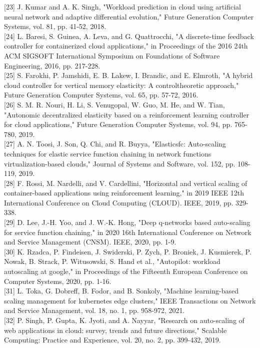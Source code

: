 \documentclass[10pt]{article}
\begin{document}
[23] J. Kumar and A. K. Singh, "Workload prediction in cloud using artificial neural network and adaptive differential evolution," Future Generation Computer Systems, vol. 81, pp. 41-52, 2018.\\[0pt]
[24] L. Baresi, S. Guinea, A. Leva, and G. Quattrocchi, "A discrete-time feedback controller for containerized cloud applications," in Proceedings of the 2016 24th ACM SIGSOFT International Symposium on Foundations of Software Engineering, 2016, pp. 217-228.\\[0pt]
[25] S. Farokhi, P. Jamshidi, E. B. Lakew, I. Brandic, and E. Elmroth, "A hybrid cloud controller for vertical memory elasticity: A controltheoretic approach," Future Generation Computer Systems, vol. 65, pp. 57-72, 2016.\\[0pt]
[26] S. M. R. Nouri, H. Li, S. Venugopal, W. Guo, M. He, and W. Tian, "Autonomic decentralized elasticity based on a reinforcement learning controller for cloud applications," Future Generation Computer Systems, vol. 94, pp. 765-780, 2019.\\[0pt]
[27] A. N. Toosi, J. Son, Q. Chi, and R. Buyya, "Elasticsfc: Auto-scaling techniques for elastic service function chaining in network functions virtualization-based clouds," Journal of Systems and Software, vol. 152, pp. 108-119, 2019.\\[0pt]
[28] F. Rossi, M. Nardelli, and V. Cardellini, "Horizontal and vertical scaling of container-based applications using reinforcement learning," in 2019 IEEE 12th International Conference on Cloud Computing (CLOUD). IEEE, 2019, pp. 329-338.\\[0pt]
[29] D. Lee, J.-H. Yoo, and J. W.-K. Hong, "Deep q-networks based auto-scaling for service function chaining," in 2020 16th International Conference on Network and Service Management (CNSM). IEEE, 2020, pp. 1-9.\\[0pt]
[30] K. Rzadca, P. Findeisen, J. Swiderski, P. Zych, P. Broniek, J. Kusmierek, P. Nowak, B. Strack, P. Witusowski, S. Hand et al., "Autopilot: workload autoscaling at google," in Proceedings of the Fifteenth European Conference on Computer Systems, 2020, pp. 1-16.\\[0pt]
[31] L. Toka, G. Dobreff, B. Fodor, and B. Sonkoly, "Machine learning-based scaling management for kubernetes edge clusters," IEEE Transactions on Network and Service Management, vol. 18, no. 1, pp. 958-972, 2021.\\[0pt]
[32] P. Singh, P. Gupta, K. Jyoti, and A. Nayyar, "Research on auto-scaling of web applications in cloud: survey, trends and future directions," Scalable Computing: Practice and Experience, vol. 20, no. 2, pp. 399-432, 2019.\\[0pt]
\end{document}
